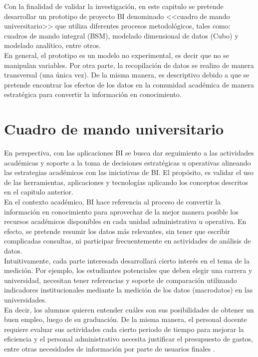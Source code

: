 \documentclass[11pt,titlepage]{report}
\begin{document}
Con la finalidad de validar la investigación, en este capitulo se pretende desarrollar un prototipo de proyecto BI denominado <<cuadro de mando universitario>> que utiliza diferentes procesos metodológicos, tales como: cuadros de mando integral (BSM), modelado dimensional de datos (Cubo) y modelado analítico, entre otros.\\

En general, el prototipo es un modelo no experimental, es decir que no se manipulan variables. Por otra parte, la recopilación de datos se realizo de manera transversal (una única vez). De la misma manera, es descriptivo debido a que se pretende encontrar los efectos de los datos en la comunidad académica de manera estratégica para convertir la información en conocimiento.\\


\newpage
\section{Cuadro de mando universitario}

En perspectiva, con las aplicaciones BI se busca dar seguimiento a las actividades académicas y soporte a la toma de decisiones estratégicas u operativas alineando las estrategias académicos con las iniciativas de BI. El propósito, es validar el uso de las herramientas, aplicaciones y tecnologías aplicando los conceptos descritos en el capitulo anterior.\\

En el contexto académico, BI hace referencia al proceso de convertir la información en conocimiento para aprovechar de la mejor manera posible los recursos académicos disponibles en cada unidad administrativa u operativa. En efecto, se pretende resumir los datos más relevantes, sin tener que escribir complicadas consultas, ni participar frecuentemente en actividades de análisis de datos.\\

Intuitivamente, cada parte interesada desarrollará cierto interés en el tema de la medición. Por ejemplo, los estudiantes potenciales que deben elegir una carrera y universidad, necesitan tener referencias y soporte de comparación utilizando indicadores institucionales mediante la medición de los datos (macrodatos) en las universidades.\\

En decir, los alumnos quieren entender cuáles son sus posibilidades de obtener un buen empleo, luego de su graduación. De la misma manera, el personal docente requiere evaluar sus actividades cada cierto periodo de tiempo para mejorar la eficiencia y el personal administrativo necesita justificar el presupuesto de gastos, entre otras necesidades de información por parte de usuarios finales \cite{web08}.\\
\end{document}
